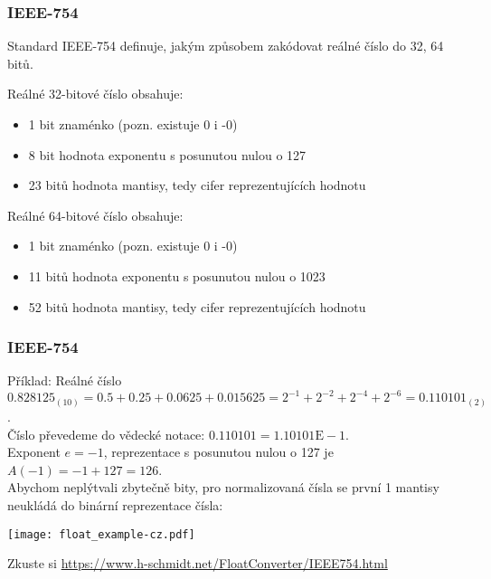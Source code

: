 \documentclass{beamer}
\begin{document}
\begin{frame}
\frametitle{IEEE-754}

Standard IEEE-754 definuje, jakým způsobem zakódovat reálné číslo do 32, 64 bitů.

Reálné 32-bitové číslo obsahuje:
\begin{itemize}
\item 1 bit znaménko (pozn. existuje 0 i -0)
\item 8 bit hodnota exponentu s posunutou nulou o 127
\item 23 bitů hodnota mantisy, tedy cifer reprezentujících hodnotu
\end{itemize}
\bigskip
Reálné 64-bitové číslo obsahuje:
\begin{itemize}
\item 1 bit znaménko (pozn. existuje 0 i -0)
\item 11 bitů hodnota exponentu s posunutou nulou o 1023
\item 52 bitů hodnota mantisy, tedy cifer reprezentujících hodnotu
\end{itemize}

\end{frame}


\begin{frame}
\frametitle{IEEE-754}

Příklad:
Reálné číslo $0.828125_{(10)} = 0.5+0.25+0.0625+0.015625=2^{-1}+2^{-2}+2^{-4}+2^{-6} = 0.110101_{(2)}$.\\
Číslo převedeme do vědecké notace: $0.110101 = 1.10101\text{E}-1$.\\
Exponent $e=-1$, reprezentace s posunutou nulou o 127 je $A(-1)=-1+127 = 126$.\\
Abychom neplýtvali zbytečně bity, pro normalizovaná čísla se první 1 mantisy neukládá do binární reprezentace čísla:

\begin{center}
\texttt{[image: float\_example-cz.pdf]}
\end{center}

Zkuste si \url{https://www.h-schmidt.net/FloatConverter/IEEE754.html}
\end{frame}
\end{document}
